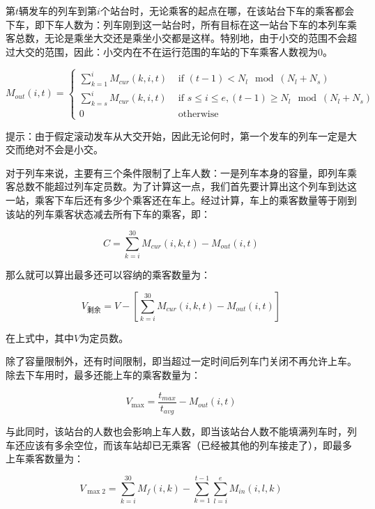 第$t$辆发车的列车到第$i$个站台时，无论乘客的起点在哪，在该站台下车的乘客都会下车，即下车人数为：列车刚到这一站台时，所有目标在这一站台下车的本列车乘客总数，无论是乘坐大交还是乘坐小交都是这样。特别地，由于小交的范围不会超过大交的范围，因此：小交内在不在运行范围的车站的下车乘客人数视为$0$。

\begin{equation}
M_{out}(i, t) = 
	\begin{cases}
	\sum _{k = 1} ^{i} M_{cur}(k, i, t)  & \text{ if } (t - 1) < N_l \mod (N_l + N_s) \\
	\sum _{k = s} ^{i} M_{cur}(k, i, t)  & \text{ if } s \leq i \leq e, (t - 1) \geq N_l \mod (N_l + N_s) \\
	0 & \text{ otherwise }
	\end{cases}
\end{equation}

提示：由于假定滚动发车从大交开始，因此无论何时，第一个发车的列车一定是大交而绝对不会是小交。

对于列车来说，主要有三个条件限制了上车人数：一是列车本身的容量，即列车乘客总数不能超过列车定员数。为了计算这一点，我们首先要计算出这个列车到达这一站，乘客下车后还有多少个乘客还在车上。经过计算，车上的乘客数量等于刚到该站的列车乘客状态减去所有下车的乘客，即：

\begin{equation}
C = \sum _{k = i} ^{30} M_{cur}(i, k, t) - M_{out}(i, t)
\end{equation}

那么就可以算出最多还可以容纳的乘客数量为：

\begin{equation}
    V_{\text{剩余}} = V-\left[ \sum _{k = i} ^{30} M_{cur}(i, k, t) - M_{out}(i, t) \right]
\end{equation}

在上式中，其中$V$为定员数。

除了容量限制外，还有时间限制，即当超过一定时间后列车门关闭不再允许上车。除去下车用时，最多还能上车的乘客数量为：

\begin{equation}
V_{\max} = \frac {t_{max}} {t_{avg}} - M_{out}(i, t)
\end{equation}

与此同时，该站台的人数也会影响上车人数，即当该站台人数不能填满列车时，列车还应该有多余空位，而该车站却已无乘客（已经被其他的列车接走了），即最多上车乘客数量为：

\begin{equation}
V_{\max2} = \sum _{k = i} ^{30} M_f(i, k) - \sum _{k = 1} ^{t - 1} \sum _{l = i} ^{e} M_{in}(i, l, k)
\end{equation}

